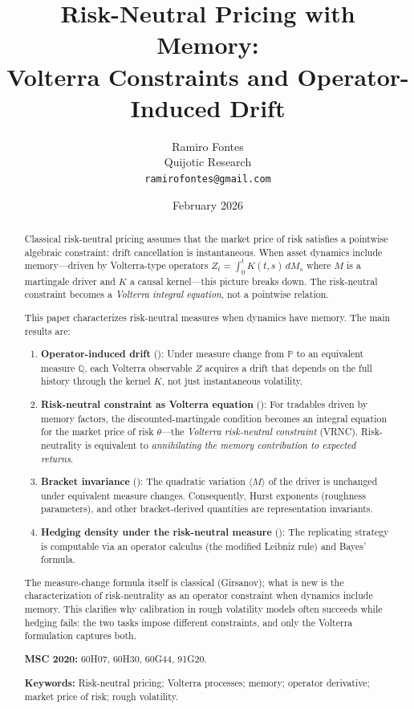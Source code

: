 \documentclass[11pt]{article}
\title{Risk-Neutral Pricing with Memory:\\[0.3em]
Volterra Constraints and Operator-Induced Drift}
\author{Ramiro Fontes\\[0.5em]
\small Quijotic Research\\[0.3em]
\small\texttt{ramirofontes@gmail.com}}
\date{February 2026}
\theoremstyle{plain}
\theoremstyle{definition}
\theoremstyle{remark}
\newcommand{\PP}{\mathbb{P}}
\newcommand{\QQ}{\mathbb{Q}}
\newcommand{\bracket}[1]{\langle #1 \rangle}
\begin{document}
\maketitle

\begin{abstract}
Classical risk-neutral pricing assumes that the market price of risk satisfies
a pointwise algebraic constraint: drift cancellation is instantaneous. When
asset dynamics include memory---driven by Volterra-type operators
$Z_t = \int_0^t K(t,s)\,dM_s$ where $M$ is a martingale driver and $K$ a
causal kernel---this picture breaks down. The risk-neutral constraint becomes
a \emph{Volterra integral equation}, not a pointwise relation.

This paper characterizes risk-neutral measures when dynamics have memory.
The main results are:

\begin{enumerate}[label=(\roman*)]
\item \textbf{Operator-induced drift} (): Under measure
change from $\PP$ to an equivalent measure $\QQ$, each Volterra observable $Z$
acquires a drift that depends on the full history through the kernel $K$, not
just instantaneous volatility.

\item \textbf{Risk-neutral constraint as Volterra equation} ():
For tradables driven by memory factors, the discounted-martingale condition
becomes an integral equation for the market price of risk $\theta$---the
\emph{Volterra risk-neutral constraint} (VRNC). Risk-neutrality is equivalent
to \emph{annihilating the memory contribution to expected returns}.

\item \textbf{Bracket invariance} (): The quadratic
variation $\bracket{M}$ of the driver is unchanged under equivalent measure
changes. Consequently, Hurst exponents (roughness parameters), and other
bracket-derived quantities are representation invariants.

\item \textbf{Hedging density under the risk-neutral measure} ():
The replicating strategy is computable via an operator calculus (the modified
Leibniz rule) and Bayes' formula.
\end{enumerate}

The measure-change formula itself is classical (Girsanov); what is new is the
characterization of risk-neutrality as an operator constraint when dynamics
include memory. This clarifies why calibration in rough volatility models
often succeeds while hedging fails: the two tasks impose different constraints,
and only the Volterra formulation captures both.

\medskip
\noindent\textbf{MSC 2020:} 60H07, 60H30, 60G44, 91G20.

\noindent\textbf{Keywords:} Risk-neutral pricing; Volterra processes; memory;
operator derivative; market price of risk; rough volatility.
\end{abstract}
\end{document}
